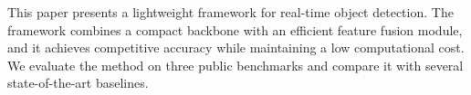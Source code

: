 This paper presents a lightweight framework for real-time object detection. The framework combines a compact backbone with an efficient feature fusion module, and it achieves competitive accuracy while maintaining a low computational cost. We evaluate the method on three public benchmarks \cite{ref1} and compare it with several state-of-the-art baselines.

